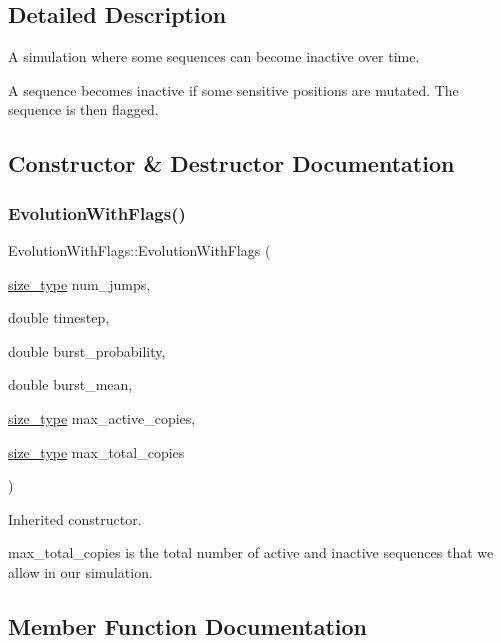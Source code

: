 \subsection{Detailed Description}
A simulation where some sequences can become inactive over time. 

A sequence becomes inactive if some sensitive positions are mutated. The sequence is then \textquotesingle{}flagged\textquotesingle{}. 

\subsection{Constructor \& Destructor Documentation}
\mbox{\label{classrcombinator_1_1EvolutionWithFlags_a4e7809583d5dcf9cf9c1155587d7e99e}} 
\subsubsection{\texorpdfstring{Evolution\+With\+Flags()}{EvolutionWithFlags()}}
{\footnotesize\ttfamily Evolution\+With\+Flags\+::\+Evolution\+With\+Flags (\begin{DoxyParamCaption}\item[{\mbox{\hyperlink{constants_8h_abcd18a5521fc90ff6e7b00e4fee98397}{size\+\_\+type}}}]{num\+\_\+jumps,  }\item[{double}]{timestep,  }\item[{double}]{burst\+\_\+probability,  }\item[{double}]{burst\+\_\+mean,  }\item[{\mbox{\hyperlink{constants_8h_abcd18a5521fc90ff6e7b00e4fee98397}{size\+\_\+type}}}]{max\+\_\+active\+\_\+copies,  }\item[{\mbox{\hyperlink{constants_8h_abcd18a5521fc90ff6e7b00e4fee98397}{size\+\_\+type}}}]{max\+\_\+total\+\_\+copies }\end{DoxyParamCaption})}



Inherited constructor. 

{\ttfamily max\+\_\+total\+\_\+copies} is the total number of active and inactive sequences that we allow in our simulation. 

\subsection{Member Function Documentation}
\mbox{\label{classrcombinator_1_1EvolutionWithFlags_ae5a9e278233d2ea42bdef4df66d4b5b9}} 

